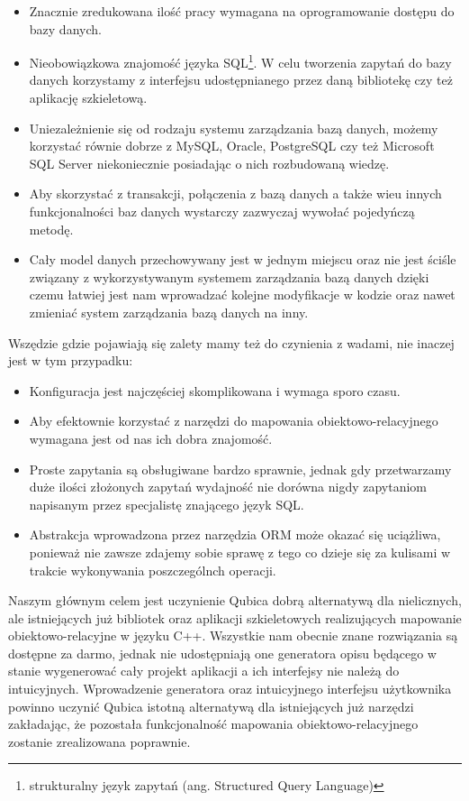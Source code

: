 \documentclass[12pt]{report}
\begin{document}
\begin{itemize}
\item Znacznie zredukowana ilość pracy wymagana na oprogramowanie dostępu do bazy danych.
\item Nieobowiązkowa znajomość języka SQL\footnote{strukturalny język zapytań (ang. Structured Query Language)}. W celu tworzenia zapytań do bazy
danych korzystamy z interfejsu udostępnianego przez daną bibliotekę czy też aplikację szkieletową.
\item Uniezależnienie się od rodzaju systemu zarządzania bazą danych, możemy korzystać równie dobrze z MySQL, Oracle, PostgreSQL czy też Microsoft SQL Server
niekoniecznie posiadając o nich rozbudowaną wiedzę.
\item Aby skorzystać z transakcji, połączenia z bazą danych a także wieu innych funkcjonalności baz danych wystarczy zazwyczaj wywołać pojedyńczą me\-to\-dę.
\item Cały model danych przechowywany jest w jednym miejscu oraz nie jest ściśle związany z wykorzystywanym systemem zarządzania bazą danych dzięki cze\-mu łatwiej 
jest nam wprowadzać kolejne modyfikacje w kodzie oraz nawet zmieniać system zarządzania bazą danych na inny.
\end{itemize}

Wszędzie gdzie pojawiają się zalety mamy też do czynienia z wadami, nie inaczej jest w tym przypadku:

\begin{itemize}
\item Konfiguracja jest najczęściej skomplikowana i wymaga sporo czasu.
\item Aby efektownie korzystać z narzędzi do mapowania obiektowo-relacyjnego wymagana jest od nas ich dobra znajomość.
\item Proste zapytania są obsługiwane bardzo sprawnie, jednak gdy przetwarzamy duże ilości złożonych zapytań wydajność nie dorówna nigdy zapytaniom na\-pi\-sa\-nym
przez specjalistę znającego język SQL.
\item Abstrakcja wprowadzona przez narzędzia ORM może okazać się uciążliwa, ponieważ nie zawsze zdajemy sobie sprawę z tego co dzieje się za kulisami w trakcie
wykonywania poszczególnch operacji.
\end{itemize}

Naszym głównym celem jest uczynienie Qubica dobrą alternatywą dla nie\-li\-cznych, ale istniejących już bibliotek oraz aplikacji szkieletowych realizujących mapowanie 
obiektowo-relacyjne w języku C++. Wszystkie nam obecnie znane rozwiązania są dostępne za darmo, jednak nie udostępniają one generatora opisu będącego w stanie 
wygenerować cały projekt aplikacji a ich interfejsy nie należą do intuicyjnych. Wprowadzenie generatora oraz intuicyjnego interfejsu użytkownika powinno uczynić Qubica
istotną alternatywą dla istniejących już narzędzi za\-kła\-da\-jąc, że pozostała funkcjonalność mapowania obiektowo-relacyjnego zostanie zre\-al\-iz\-owana poprawnie.
\end{document}

